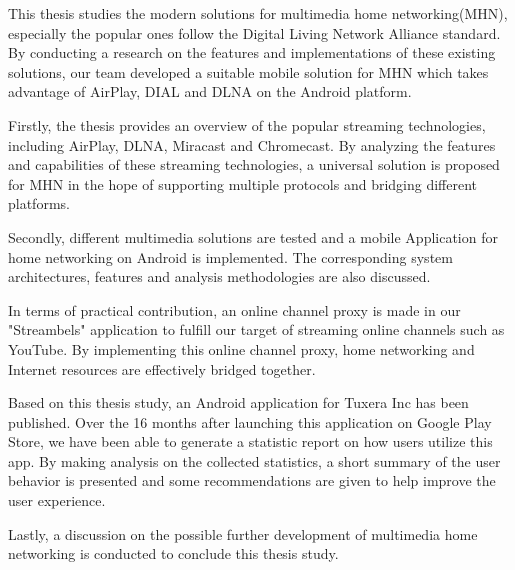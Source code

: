This thesis studies the modern solutions for multimedia home networking(MHN), especially the popular ones follow the Digital Living
 Network Alliance standard. By conducting a research on the features and implementations of these existing solutions, our team developed a suitable mobile solution for MHN
 which takes advantage of AirPlay, DIAL and DLNA on the Android
 platform.

Firstly, the thesis provides an overview of the popular streaming technologies, including AirPlay,
DLNA, Miracast and Chromecast. By analyzing the features and capabilities of
these streaming technologies, a universal solution is proposed for MHN in the hope of  supporting multiple protocols and bridging
 different platforms.

Secondly, different multimedia solutions are tested and a mobile Application
for home networking on Android is implemented. The corresponding system architectures, features and analysis methodologies are also discussed.

In terms of practical contribution, an online channel proxy is made in our "Streambels" application to fulfill our target of streaming online channels such as YouTube. By implementing this online channel proxy, home
 networking and Internet resources are effectively bridged together. 

Based on this thesis study, an Android application for Tuxera Inc has been published. Over the 16 months after launching this application on Google Play Store, we have been able to generate a statistic report on how users utilize this app. By making analysis on the collected statistics, a short summary of the user behavior is presented and some recommendations are given to help improve the user experience.

Lastly, a discussion on the possible further
 development of multimedia home networking is conducted to conclude this thesis study. 